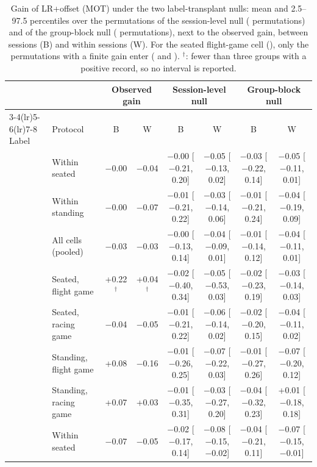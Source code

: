 \begin{table}[ht]
\centering
\scriptsize
\caption{Gain of LR+offset (MOT) under the two label-transplant nulls: mean and 2.5--97.5 percentiles over the permutations of the session-level null ( permutations) and of the group-block null ( permutations), next to the observed gain, between sessions (B) and within sessions (W). For the seated flight-game cell (\sevtwo{}), only the permutations with a finite gain enter ( and ). $^\dagger$: fewer than three groups with a positive record, so no interval is reported.}
\label{tab:supp_nullranges}
\setlength{\tabcolsep}{3pt}
\begin{tabular}{@{}llcccccc@{}}
\toprule
 & & \multicolumn{2}{c}{Observed gain} & \multicolumn{2}{c}{Session-level null} & \multicolumn{2}{c}{Group-block null} \\
\cmidrule(lr){3-4}\cmidrule(lr){5-6}\cmidrule(lr){7-8}
Label & Protocol & B & W & B & W & B & W \\
\midrule
\sevtwo{} & Within seated & $-$0.00 & $-$0.04 & $-$0.00 [$-$0.21, 0.20] & $-$0.05 [$-$0.13, 0.02] & $-$0.03 [$-$0.22, 0.14] & $-$0.05 [$-$0.11, 0.01] \\
 & Within standing & $-$0.00 & $-$0.07 & $-$0.01 [$-$0.21, 0.22] & $-$0.03 [$-$0.14, 0.06] & $-$0.01 [$-$0.21, 0.24] & $-$0.04 [$-$0.19, 0.09] \\
 & All cells (pooled) & $-$0.03 & $-$0.03 & $-$0.00 [$-$0.13, 0.14] & $-$0.04 [$-$0.09, 0.01] & $-$0.01 [$-$0.14, 0.12] & $-$0.04 [$-$0.11, 0.01] \\
 & Seated, flight game & +0.22$^\dagger$ & +0.04$^\dagger$ & $-$0.02 [$-$0.40, 0.34] & $-$0.05 [$-$0.53, 0.03] & $-$0.02 [$-$0.23, 0.19] & $-$0.03 [$-$0.14, 0.03] \\
 & Seated, racing game & $-$0.04 & $-$0.05 & $-$0.01 [$-$0.21, 0.22] & $-$0.06 [$-$0.14, 0.02] & $-$0.02 [$-$0.20, 0.15] & $-$0.04 [$-$0.11, 0.02] \\
 & Standing, flight game & +0.08 & $-$0.16 & $-$0.01 [$-$0.26, 0.25] & $-$0.07 [$-$0.22, 0.03] & $-$0.01 [$-$0.27, 0.26] & $-$0.07 [$-$0.20, 0.12] \\
 & Standing, racing game & +0.07 & +0.03 & $-$0.01 [$-$0.35, 0.31] & $-$0.03 [$-$0.27, 0.20] & $-$0.04 [$-$0.32, 0.23] & +0.01 [$-$0.18, 0.18] \\
\midrule
\sevone{} & Within seated & $-$0.07 & $-$0.05 & $-$0.02 [$-$0.17, 0.14] & $-$0.08 [$-$0.15, $-$0.02] & $-$0.04 [$-$0.21, 0.11] & $-$0.07 [$-$0.15, $-$0.01] \\

\end{tabular}
\end{table}
